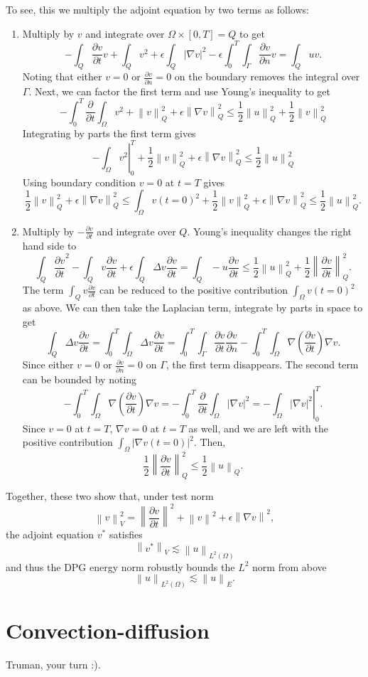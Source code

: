 \documentclass{article}
\newcommand{\grad}{\nabla}
\newcommand{\pd}[2]{\frac{\partial#1}{\partial#2}}
\newcommand{\nor}[1]{\left\| #1 \right\|}
\newcommand{\LRp}[1]{\left( #1 \right)}
\newcommand{\LRb}[1]{\left| #1 \right|}
\renewcommand{\L}{L^2\LRp{\Omega}}
\begin{document}
To see, this we multiply the adjoint equation by two terms as follows:
\begin{enumerate}
\item Multiply by $v$ and integrate over $\Omega \times [0,T] = Q$ to get
\[
-\int_Q \pd{v}{t}v + \int_Q v^2 + \epsilon \int_Q \LRb{\grad v}^2 - \epsilon \int_0^T\int_{\Gamma} \pd{v}{n}v = \int_Q uv.
\]
Noting that either $v = 0$ or $\pd{v}{n} = 0$ on the boundary removes the integral over $\Gamma$.  Next, we can factor the first term and use Young's inequality to get
\[
-\int_0^T  \pd{}{t}\int_{\Omega} v^2 + \nor{v}^2_Q + \epsilon \nor{\grad v}^2_Q \leq \frac{1}{2}\nor{u}^2_Q + \frac{1}{2}\nor{v}^2_Q
\]
Integrating by parts the first term gives
\[
-\left.\int_{\Omega} v^2\right|_0^T + \frac{1}{2}\nor{v}^2_Q + \epsilon \nor{\grad v}^2_Q \leq \frac{1}{2}\nor{u}^2_Q
\]
Using boundary condition $v=0$ at $t= T$ gives
\[
\frac{1}{2}\nor{v}^2_Q + \epsilon \nor{\grad v}^2_Q \leq \int_{\Omega} v(t=0)^2 + \frac{1}{2}\nor{v}^2_Q + \epsilon \nor{\grad v}^2_Q \leq \frac{1}{2}\nor{u}^2_Q.
\]

\item Multiply by $-\pd{v}{t}$ and integrate over $Q$.  Young's inequality changes the right hand side to 
\[
\int_Q\pd{v}{t}^2 - \int_Q v\pd{v}{t} + \epsilon\int_Q \Delta v \pd{v}{t} = \int_Q -u \pd{v}{t} \leq \frac{1}{2}\nor{u}_Q^2 + \frac{1}{2}\nor{\pd{v}{t}}_Q^2 .
\]
The term $\int_Q v\pd{v}{t}$ can be reduced to the positive contribution $\int_{\Omega}{v(t=0)}^2  $ as above.  We can then take the Laplacian term, integrate by parts in space to get
\[
\int_Q \Delta v \pd{v}{t} = \int_0^T \int_{\Omega} \Delta v \pd{v}{t} =  \int_0^T \int_{\Gamma} \pd{v}{t}\pd{v}{n} - \int_0^T \int_{\Omega}\grad\LRp{\pd{v}{t}}\grad v.
\]
Since either $v = 0$ or $\pd{v}{n} = 0$ on $\Gamma$, the first term disappears.  The second term can be bounded by noting
\[
- \int_0^T \int_{\Omega}\grad\LRp{\pd{v}{t}}\grad v = - \int_0^T \pd{}{t}\int_{\Omega}\LRb{\grad v} ^2 = - \left.\int_{\Omega}\LRb{\grad v}^2 \right|_0^T.
\]
Since $v = 0$ at $t=T$, $\grad v = 0$ at $t=T$ as well, and we are left with the positive contribution $\int_{\Omega}\LRb{\grad v(t=0)}^2$.  Then,
\[
\frac{1}{2}\nor{\pd{v}{t}}_Q^2 \leq \frac{1}{2}\nor{u}_Q.
\]
\end{enumerate}
Together, these two show that, under test norm
\[
\nor{v}_V^2 = \nor{\pd{v}{t}}^2 + \nor{v}^2 + \epsilon\nor{\grad v}^2,
\]
the adjoint equation $v^*$ satisfies
\[
\nor{v^*}_V \lesssim \nor{u}_{\L}
\]
and thus the DPG energy norm robustly bounds the $L^2$ norm from above
\[
\nor{u}_{\L} \lesssim \nor{u}_E.
\]

\section{Convection-diffusion}

Truman, your turn :).
\end{document}

